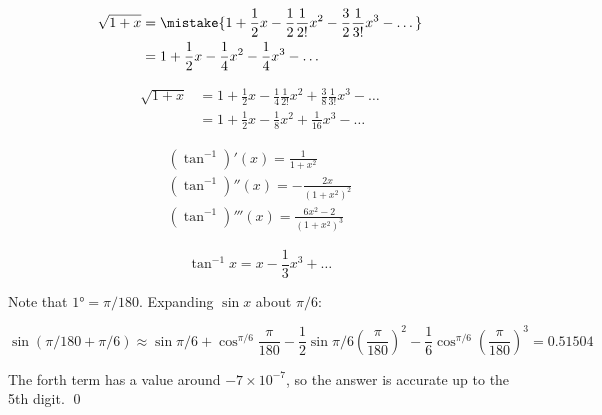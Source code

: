 \documentclass[12pt]{article}
\begin{document}
\begin{equation}
    \begin{split}
        \sqrt{1 + x} &= \mistake{1 + \frac{1}{2} x - \frac{1}{2} \frac{1}{2!} x^{2} - \frac{3}{2} \frac{1}{3!} x^{3} - \dots} \\
        &= 1 + \frac{1}{2} x - \frac{1}{4} x^{2} - \frac{1}{4} x^{3} - \dots
    \end{split}
\end{equation}

\begin{correction}
    \begin{equation}
        \begin{split}
            \sqrt{1 + x} &= 1 + \frac{1}{2} x - \frac{1}{4} \frac{1}{2!} x^{2} + \frac{3}{8} \frac{1}{3!} x^{3} - \dots \\
            &= 1 + \frac{1}{2} x - \frac{1}{8} x^{2} + \frac{1}{16} x^{3} - \dots
        \end{split}
    \end{equation}
\end{correction}


\begin{equation}
    \begin{split}
        (\tan^{-1})'(x) = \frac{1}{1 + x^{2}} \\
        (\tan^{-1})''(x) = -\frac{2x}{(1 + x^{2})^{2}} \\
        (\tan^{-1})'''(x) = \frac{6x^{2} - 2}{(1 + x^{2})^{3}}
    \end{split}
\end{equation}

\begin{equation}
    \tan^{-1}{x} = x - \frac{1}{3} x^{3} + \dots
\end{equation}

Note that $\ang{1} = \pi/180$. Expanding $\sin{x}$ about $\pi/6$:

\begin{equation}
    \sin{\left( \pi/180 + \pi/6 \right)} \approx \sin{\pi/6} + \cos^{\pi/6} \frac{\pi}{180} - \frac{1}{2} \sin{\pi/6} \left( \frac{\pi}{180} \right)^{2} - \frac{1}{6} \cos^{\pi/6} \left( \frac{\pi}{180} \right)^{3} = 0.51504
\end{equation}

The forth term has a value around $-7 \times 10^{-7}$, so the answer is accurate up to the 5th digit.
\qed


\end{document}
